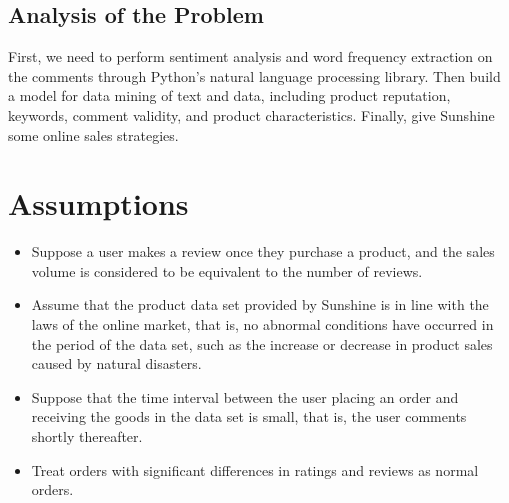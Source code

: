 \documentclass{mcmthesis}
\begin{document}
\subsection{Analysis of the Problem}

First, we need to perform sentiment analysis and word frequency extraction on the comments through Python's natural language processing library. Then build a model for data mining of text and data, including product reputation, keywords, comment validity, and product characteristics. Finally, give Sunshine some online sales strategies.

\newpage
\section{Assumptions}

\begin{itemize}

\item Suppose a user makes a review once they purchase a product, and the sales volume is considered to be equivalent to the number of reviews.

\item Assume that the product data set provided by Sunshine is in line with the laws of the online market, that is, no abnormal conditions have occurred in the period of the data set, such as the increase or decrease in product sales caused by natural disasters.

\item Suppose that the time interval between the user placing an order and receiving the goods in the data set is small, that is, the user comments shortly thereafter.

\item Treat orders with significant differences in ratings and reviews as normal orders.

\end{itemize}
\end{document}
